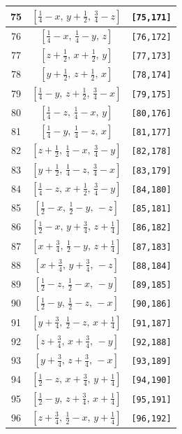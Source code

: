 \documentclass[fleqn,8pt]{jsarticle}
\begin{document}
\begin{longtable}{ccc}
75 & $\left[ \frac{1}{4} - x,\, y + \frac{1}{2},\, \frac{3}{4} - z \right]$ & {\tt [75,171]} \\ \hline
76 & $\left[ \frac{1}{4} - x,\, \frac{1}{4} - y,\, z \right]$ & {\tt [76,172]} \\ \hline
77 & $\left[ z + \frac{1}{2},\, x + \frac{1}{2},\, y \right]$ & {\tt [77,173]} \\ \hline
78 & $\left[ y + \frac{1}{2},\, z + \frac{1}{2},\, x \right]$ & {\tt [78,174]} \\ \hline
79 & $\left[ \frac{1}{4} - y,\, z + \frac{1}{2},\, \frac{3}{4} - x \right]$ & {\tt [79,175]} \\ \hline
80 & $\left[ \frac{1}{4} - z,\, \frac{1}{4} - x,\, y \right]$ & {\tt [80,176]} \\ \hline
81 & $\left[ \frac{1}{4} - y,\, \frac{1}{4} - z,\, x \right]$ & {\tt [81,177]} \\ \hline
82 & $\left[ z + \frac{1}{2},\, \frac{1}{4} - x,\, \frac{3}{4} - y \right]$ & {\tt [82,178]} \\ \hline
83 & $\left[ y + \frac{1}{2},\, \frac{1}{4} - z,\, \frac{3}{4} - x \right]$ & {\tt [83,179]} \\ \hline
84 & $\left[ \frac{1}{4} - z,\, x + \frac{1}{2},\, \frac{3}{4} - y \right]$ & {\tt [84,180]} \\ \hline
85 & $\left[ \frac{1}{2} - x,\, \frac{1}{2} - y,\, - z \right]$ & {\tt [85,181]} \\ \hline
86 & $\left[ \frac{1}{2} - x,\, y + \frac{3}{4},\, z + \frac{1}{4} \right]$ & {\tt [86,182]} \\ \hline
87 & $\left[ x + \frac{3}{4},\, \frac{1}{2} - y,\, z + \frac{1}{4} \right]$ & {\tt [87,183]} \\ \hline
88 & $\left[ x + \frac{3}{4},\, y + \frac{3}{4},\, - z \right]$ & {\tt [88,184]} \\ \hline
89 & $\left[ \frac{1}{2} - z,\, \frac{1}{2} - x,\, - y \right]$ & {\tt [89,185]} \\ \hline
90 & $\left[ \frac{1}{2} - y,\, \frac{1}{2} - z,\, - x \right]$ & {\tt [90,186]} \\ \hline
91 & $\left[ y + \frac{3}{4},\, \frac{1}{2} - z,\, x + \frac{1}{4} \right]$ & {\tt [91,187]} \\ \hline
92 & $\left[ z + \frac{3}{4},\, x + \frac{3}{4},\, - y \right]$ & {\tt [92,188]} \\ \hline
93 & $\left[ y + \frac{3}{4},\, z + \frac{3}{4},\, - x \right]$ & {\tt [93,189]} \\ \hline
94 & $\left[ \frac{1}{2} - z,\, x + \frac{3}{4},\, y + \frac{1}{4} \right]$ & {\tt [94,190]} \\ \hline
95 & $\left[ \frac{1}{2} - y,\, z + \frac{3}{4},\, x + \frac{1}{4} \right]$ & {\tt [95,191]} \\ \hline
96 & $\left[ z + \frac{3}{4},\, \frac{1}{2} - x,\, y + \frac{1}{4} \right]$ & {\tt [96,192]} \\
\end{longtable}
\end{document}
